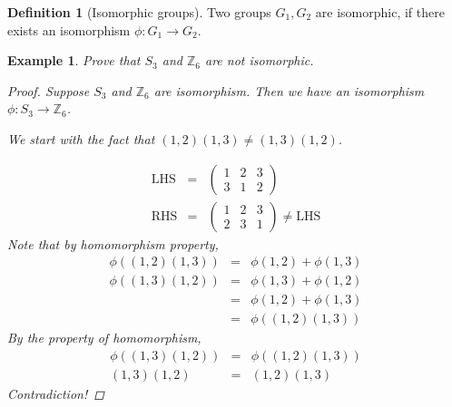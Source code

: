 \documentclass{article}
\theoremstyle{MyNonumberplain}
\theoremstyle{break}
\newtheorem*{proof}{Proof. }
\newcommand{\p}{\phi}
\newcommand{\tmop}{\text}
\theoremstyle{break}
\newtheorem{example}{Example}[section]
\theoremstyle{break}
\theoremstyle{definition}
\theoremstyle{break}
\newtheorem{definition}{Definition}[section]
\begin{document}
\begin{defbox}
    \begin{definition}[Isomorphic groups]
        Two groups $G_1, G_2$ are isomorphic, if there exists an isomorphism $\p : G_1
        \rightarrow G_2$.
    \end{definition}
\end{defbox}

\begin{expbox}
    \begin{example}
        Prove that $S_3$ and $\mathbb{Z}_6$ are not isomorphic.
        \begin{prfbox}
            \begin{proof}
                Suppose $S_3$ and $\mathbb{Z}_6$ are isomorphism. Then we have an isomorphism
                $\p : S_3 \rightarrow \mathbb{Z}_6$.\bigskip

                We start with the fact that $(1, 2) (1, 3) \neq (1, 3) (1, 2)$.\bigskip

                \begin{eqnarray*}
                \tmop{LHS} & = & \left(\begin{array}{ccc}
                    1 & 2 & 3\\
                    3 & 1 & 2
                \end{array}\right)\\
                \tmop{RHS} & = & \left(\begin{array}{ccc}
                    1 & 2 & 3\\
                    2 & 3 & 1
                \end{array}\right) \neq \tmop{LHS}
                \end{eqnarray*}
                Note that by homomorphism property,
                \begin{eqnarray*}
                \p ((1, 2) (1, 3)) & = & \p (1, 2) + \p (1, 3)\\
                \p ((1, 3) (1, 2)) & = & \p (1, 3) + \p (1, 2)\\
                & = & \p (1, 2) + \p (1, 3)\\
                & = & \p ((1, 2) (1, 3))
                \end{eqnarray*}
                By the property of homomorphism,
                \begin{eqnarray*}
                \p ((1, 3) (1, 2)) & = & \p ((1, 2) (1, 3))\\
                (1, 3) (1, 2) & = & (1, 2) (1, 3)
                \end{eqnarray*}
                Contradiction!
            \end{proof}
        \end{prfbox}
    \end{example}
\end{expbox}
\end{document}

